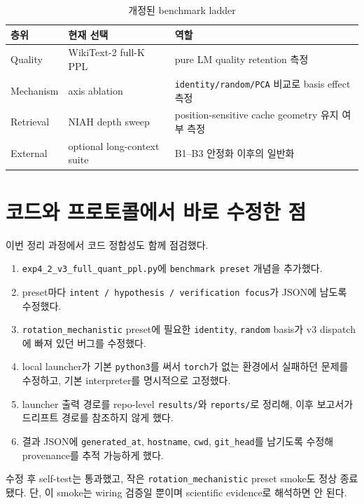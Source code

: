 \documentclass[11pt,a4paper]{article}
\begin{document}
\begin{table}[H]
\centering
\caption{개정된 benchmark ladder}
\small
\begin{tabularx}{\textwidth}{@{}l l X@{}}
\toprule
\textbf{층위} & \textbf{현재 선택} & \textbf{역할} \\
\midrule
Quality & WikiText-2 full-K PPL & pure LM quality retention 측정 \\
Mechanism & axis ablation & \texttt{identity/random/PCA} 비교로 basis effect 측정 \\
Retrieval & NIAH depth sweep & position-sensitive cache geometry 유지 여부 측정 \\
External & optional long-context suite & B1--B3 안정화 이후의 일반화 \\
\bottomrule
\end{tabularx}
\end{table}

\section{코드와 프로토콜에서 바로 수정한 점}

이번 정리 과정에서 코드 정합성도 함께 점검했다.

\begin{enumerate}
\item \texttt{exp4\_2\_v3\_full\_quant\_ppl.py}에 \texttt{benchmark preset} 개념을 추가했다.
\item preset마다 \texttt{intent / hypothesis / verification focus}가 JSON에 남도록 수정했다.
\item \texttt{rotation\_mechanistic} preset에 필요한 \texttt{identity}, \texttt{random} basis가 v3 dispatch에 빠져 있던 버그를 수정했다.
\item local launcher가 기본 \texttt{python3}를 써서 \texttt{torch}가 없는 환경에서 실패하던 문제를 수정하고, 기본 interpreter를 명시적으로 고정했다.
\item launcher 출력 경로를 repo-level \texttt{results/}와 \texttt{reports/}로 정리해, 이후 보고서가 드리프트 경로를 참조하지 않게 했다.
\item 결과 JSON에 \texttt{generated\_at}, \texttt{hostname}, \texttt{cwd}, \texttt{git\_head}를 남기도록 수정해 provenance를 추적 가능하게 했다.
\end{enumerate}

수정 후 self-test는 통과했고, 작은 \texttt{rotation\_mechanistic} preset smoke도 정상 종료됐다. 단, 이 smoke는 wiring 검증일 뿐이며 scientific evidence로 해석하면 안 된다.
\end{document}
